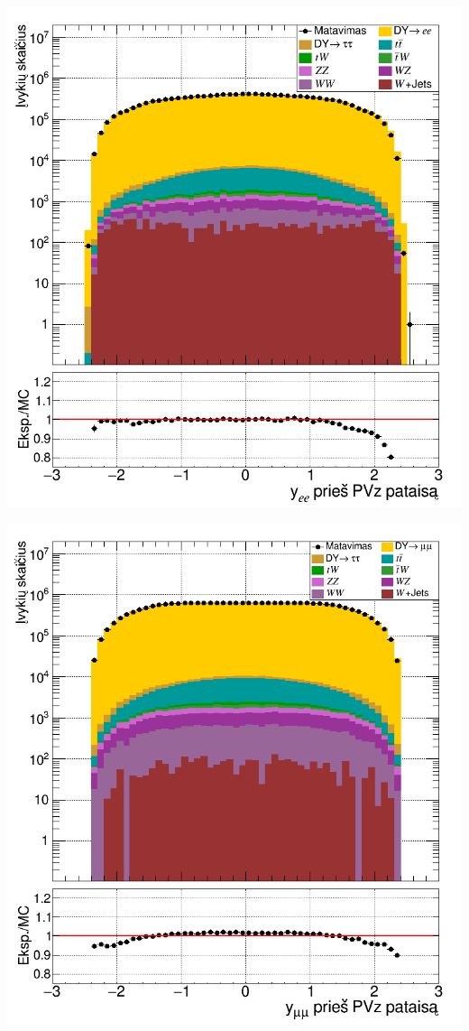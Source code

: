 \documentclass[a4paper, 12pt]{article}
\begin{document}
\vspace{0.25cm}
\begin{minipage}[t]{0.48\textwidth}
	\includegraphics[width=\linewidth]{ee_rapi_beforePVZ.png}
\end{minipage}
\hfill
\begin{minipage}[t]{0.48\textwidth}
	\includegraphics[width=\linewidth]{mumu_rapi_beforePVZ.png}
\end{minipage}
\end{document}
